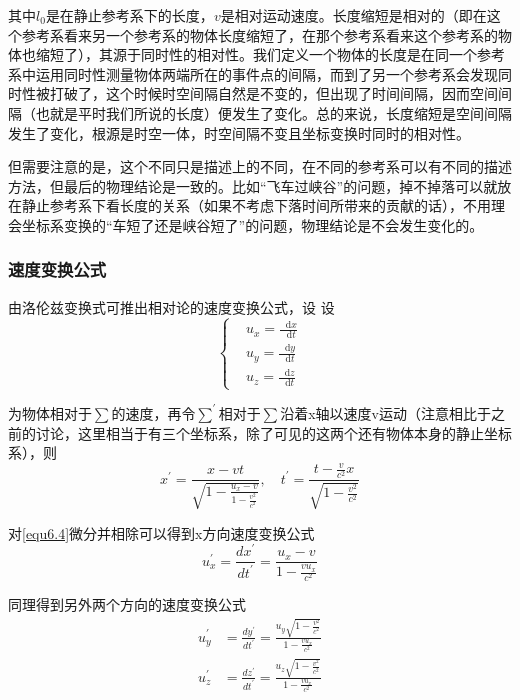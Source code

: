 \documentclass[UTF8]{ctexart}
\newcommand*{\dif}{\mathop{}\!\mathrm{d}}
\begin{document}
\noindent 其中$l_0$是在静止参考系下的长度，$v$是相对运动速度。长度缩短是相对的（即在这个参考系看来另一个参考系的物体长度缩短了，在那个参考系看来这个参考系的物体也缩短了），其源于同时性的相对性。我们定义一个物体的长度是在同一个参考系中运用同时性测量物体两端所在的事件点的间隔，而到了另一个参考系会发现同时性被打破了，这个时候时空间隔自然是不变的，但出现了时间间隔，因而空间间隔（也就是平时我们所说的长度）便发生了变化。总的来说，长度缩短是空间间隔发生了变化，根源是时空一体，时空间隔不变且坐标变换时同时的相对性。

    但需要注意的是，这个不同只是描述上的不同，在不同的参考系可以有不同的描述方法，但最后的物理结论是一致的。比如“飞车过峡谷”的问题，掉不掉落可以就放在静止参考系下看长度的关系（如果不考虑下落时间所带来的贡献的话），不用理会坐标系变换的“车短了还是峡谷短了”的问题，物理结论是不会发生变化的。

    \subsubsection{速度变换公式}
    由洛伦兹变换式可推出相对论的速度变换公式，设
    设
    \begin{equation}
        \left \{ \begin{aligned}
            &u_x = \frac{\dif x}{\dif t} \\
            &u_y = \frac{\dif y}{\dif t} \\
            &u_z = \frac{\dif z}{\dif t}
        \end{aligned} \right.
    \end{equation}

\noindent 为物体相对于$\sum$的速度，再令$\sum^{\prime}$相对于$\sum$沿着x轴以速度v运动（注意相比于之前的讨论，这里相当于有三个坐标系，除了可见的这两个还有物体本身的静止坐标系），则
\begin{equation}
    x^{\prime} = \frac{x-vt}{\sqrt{1-\frac{u_x-v}{1-\frac{v^2}{c^2}}}}, \quad t^{\prime} = \frac{t-\frac{v}{c^2}x}{\sqrt{1-\frac{v^2}{c^2}}}\label{equ6.4}
\end{equation}

\noindent 对\autoref{equ6.4}微分并相除可以得到x方向速度变换公式
\begin{equation}
    u^{\prime}_{x}=\frac{d x^{\prime}}{d t^{\prime}}=\frac{u_{x}-v}{1-\frac{v u_{x}}{c^{2}}}
\end{equation}

\noindent 同理得到另外两个方向的速度变换公式
\begin{equation}
\begin{aligned}u_{y}^{\prime}&=\frac{d y^{\prime}}{d t^{\prime}}=\frac{u_{y} \sqrt{1-\frac{v^{2}}{c^{2}}}}{1-\frac{v u_{x}}{c^{2}}} \\ u_{z}^{\prime}&=\frac{d z^{\prime}}{d t^{\prime}}=\frac{u_{z} \sqrt{1-\frac{v^{2}}{c^{2}}}}{1-\frac{v u_{x}}{c^{2}}}\end{aligned}
\end{equation}
\end{document}
